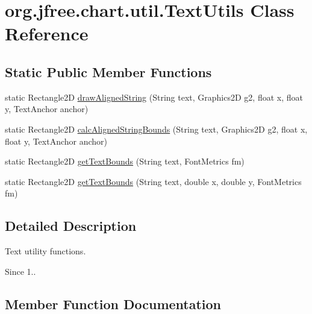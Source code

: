 \hypertarget{classorg_1_1jfree_1_1chart_1_1util_1_1_text_utils}{}\section{org.\+jfree.\+chart.\+util.\+Text\+Utils Class Reference}
\label{classorg_1_1jfree_1_1chart_1_1util_1_1_text_utils}
\subsection*{Static Public Member Functions}
\begin{DoxyCompactItemize}
\item 
static Rectangle2D \mbox{\hyperlink{classorg_1_1jfree_1_1chart_1_1util_1_1_text_utils_aa103f87e87e43cc08d5200ce76f38332}{draw\+Aligned\+String}} (String text, Graphics2D g2, float x, float y, Text\+Anchor anchor)
\item 
static Rectangle2D \mbox{\hyperlink{classorg_1_1jfree_1_1chart_1_1util_1_1_text_utils_adda277af6278e2bb24f020af4acebd2b}{calc\+Aligned\+String\+Bounds}} (String text, Graphics2D g2, float x, float y, Text\+Anchor anchor)
\item 
static Rectangle2D \mbox{\hyperlink{classorg_1_1jfree_1_1chart_1_1util_1_1_text_utils_a3c23c63c9de1360e67fd5a9aed6a4b1c}{get\+Text\+Bounds}} (String text, Font\+Metrics fm)
\item 
static Rectangle2D \mbox{\hyperlink{classorg_1_1jfree_1_1chart_1_1util_1_1_text_utils_a29ee9c4134704345f7d697847f11e1a6}{get\+Text\+Bounds}} (String text, double x, double y, Font\+Metrics fm)
\end{DoxyCompactItemize}


\subsection{Detailed Description}
Text utility functions.

\begin{DoxySince}{Since}
1.. 
\end{DoxySince}


\subsection{Member Function Documentation}
\mbox{\label{classorg_1_1jfree_1_1chart_1_1util_1_1_text_utils_adda277af6278e2bb24f020af4acebd2b}} 
